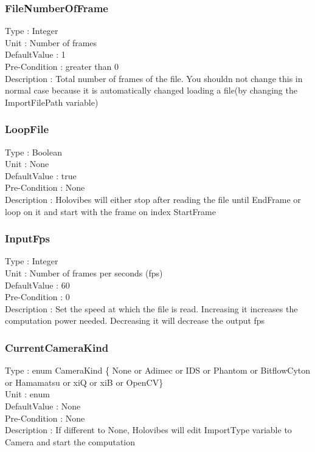 \subsubsection{FileNumberOfFrame}
\noindent
Type : Integer\\
Unit : Number of frames\\
DefaultValue : 1\\
Pre-Condition : greater than 0\\
Description : Total number of frames of the file. You shouldn not change this in normal case because it is automatically changed loading a file(by changing the ImportFilePath variable)\\

\subsubsection{LoopFile}
\noindent
Type : Boolean\\
Unit : None\\
DefaultValue : true\\
Pre-Condition : None\\
Description : Holovibes will either stop after reading the file until EndFrame or loop on it and start with the frame on index StartFrame\\

\subsubsection{InputFps}
\noindent
Type : Integer\\
Unit : Number of frames per seconds (fps)\\
DefaultValue : 60\\
Pre-Condition : 0\\
Description : Set the speed at which the file is read. Increasing it increases the computation power needed. Decreasing it will decrease the output fps\\

\subsubsection{CurrentCameraKind}
\noindent
Type : enum CameraKind \{ None or Adimec or IDS or Phantom or BitflowCyton or Hamamatsu or xiQ or xiB or OpenCV\}\\
Unit : enum \\
DefaultValue : None\\
Pre-Condition : None\\
Description : If different to None, Holovibes will edit ImportType variable to Camera and start the computation\\


